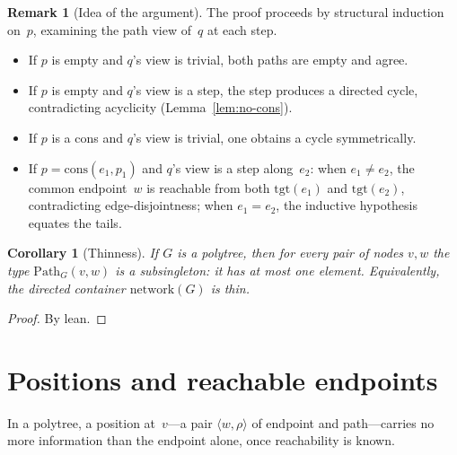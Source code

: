 \documentclass[11pt,a4paper]{article}
\theoremstyle{plain}
\newtheorem{corollary}[theorem]{Corollary}
\theoremstyle{definition}
\newtheorem{remark}[theorem]{Remark}
\newcommand{\tgt}{\mathrm{tgt}}
\begin{document}
\begin{remark}[Idea of the argument]
The proof proceeds by structural induction on~$p$, examining the path view
of~$q$ at each step.
\begin{itemize}
  \item If $p$ is empty and $q$'s view is trivial, both paths are empty and
        agree.
  \item If $p$ is empty and $q$'s view is a step, the step produces a directed
        cycle, contradicting acyclicity (Lemma~\ref{lem:no-cons}).
  \item If $p$ is a cons and $q$'s view is trivial, one obtains a cycle
        symmetrically.
  \item If $p = \mathrm{cons}(e_1,p_1)$ and $q$'s view is a step along~$e_2$:
        when $e_1 \neq e_2$, the common endpoint~$w$ is reachable from both
        $\tgt(e_1)$ and $\tgt(e_2)$, contradicting edge-disjointness; when
        $e_1 = e_2$, the inductive hypothesis equates the tails.
\end{itemize}
\end{remark}

\begin{corollary}[Thinness]\label{cor:thin}
If $G$ is a polytree, then for every pair of nodes $v,w$ the type
$\mathrm{Path}_G(v,w)$ is a subsingleton: it has at most one element.
Equivalently, the directed container $\mathrm{network}(G)$ is thin.
\end{corollary}

\begin{proof}
By lean.
\end{proof}

\section{Positions and reachable endpoints}

In a polytree, a position at~$v$---a pair $\langle w,\rho \rangle$ of endpoint
and path---carries no more information than the endpoint alone, once
reachability is known.
\end{document}
